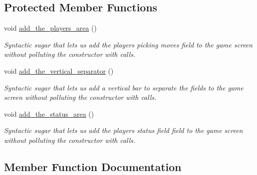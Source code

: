 \subsection*{Protected Member Functions}
\begin{DoxyCompactItemize}
\item 
\mbox{\label{classPlayer_ad54e865cdd46c0d763c75e67f66ffed2}} 
void \mbox{\hyperlink{classPlayer_ad54e865cdd46c0d763c75e67f66ffed2}{add\+\_\+the\+\_\+players\+\_\+area}} ()
\begin{DoxyCompactList}\small\item\em Syntactic sugar that lets us add the player\textquotesingle{}s \textquotesingle{}picking moves\textquotesingle{} field to the game screen without polluting the constructor with calls. \end{DoxyCompactList}\item 
\mbox{\label{classPlayer_a10407e8b62837aa1eb8bd64541a00858}} 
void \mbox{\hyperlink{classPlayer_a10407e8b62837aa1eb8bd64541a00858}{add\+\_\+the\+\_\+vertical\+\_\+separator}} ()
\begin{DoxyCompactList}\small\item\em Syntactic sugar that lets us add a vertical bar to separate the fields to the game screen without polluting the constructor with calls. \end{DoxyCompactList}\item 
\mbox{\label{classPlayer_afab406aeae771c39b2e1779f673dbce9}} 
void \mbox{\hyperlink{classPlayer_afab406aeae771c39b2e1779f673dbce9}{add\+\_\+the\+\_\+status\+\_\+area}} ()
\begin{DoxyCompactList}\small\item\em Syntactic sugar that lets us add the player\textquotesingle{}s status field field to the game screen without polluting the constructor with calls. \end{DoxyCompactList}\end{DoxyCompactItemize}


\subsection{Member Function Documentation}
\mbox{\label{classPlayer_af2e144daeef7b9582a6167ac822dcb69}} 

